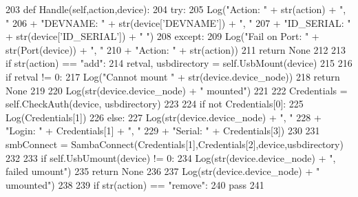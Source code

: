 \begin{DoxyCode}
203     \textcolor{keyword}{def }Handle(self,action,device):
204         \textcolor{keywordflow}{try}:
205             Log(\textcolor{stringliteral}{"Action: "} + str(action) + \textcolor{stringliteral}{", "}
206                 + \textcolor{stringliteral}{"DEVNAME: "} + str(device[\textcolor{stringliteral}{'DEVNAME'}]) + \textcolor{stringliteral}{", "}
207                 + \textcolor{stringliteral}{"ID\_SERIAL: "} + str(device[\textcolor{stringliteral}{'ID\_SERIAL'}]) + \textcolor{stringliteral}{" "})
208         \textcolor{keywordflow}{except}:
209             Log(\textcolor{stringliteral}{"Fail on Port: "} + str(Port(device)) + \textcolor{stringliteral}{", "}
210                 + \textcolor{stringliteral}{"Action: "} + str(action))
211             \textcolor{keywordflow}{return} \textcolor{keywordtype}{None}
212 
213         \textcolor{keywordflow}{if} str(action) == \textcolor{stringliteral}{"add"}:
214             retval, usbdirectory = self.UsbMount(device)
215 
216             \textcolor{keywordflow}{if} retval != 0:
217                 Log(\textcolor{stringliteral}{"Cannot mount "} + str(device.device\_node))
218                 \textcolor{keywordflow}{return} \textcolor{keywordtype}{None}
219 
220             Log(str(device.device\_node) + \textcolor{stringliteral}{" mounted"})
221 
222             Credentials = self.CheckAuth(device, usbdirectory)
223 
224             \textcolor{keywordflow}{if} \textcolor{keywordflow}{not} Credentials[0]:
225                 Log(Credentials[1])
226             \textcolor{keywordflow}{else}:
227                 Log(str(device.device\_node) + \textcolor{stringliteral}{", "}
228                     + \textcolor{stringliteral}{"Login: "} + Credentials[1] + \textcolor{stringliteral}{", "}
229                     + \textcolor{stringliteral}{"Serial: "} + Credentials[3])
230 
231                 smbConnect = SambaConnect(Credentials[1],Credentials[2],device,usbdirectory)
232 
233             \textcolor{keywordflow}{if} self.UsbUmount(device) != 0:
234                 Log(str(device.device\_node) + \textcolor{stringliteral}{", failed umount"})
235                 \textcolor{keywordflow}{return} \textcolor{keywordtype}{None}
236 
237             Log(str(device.device\_node) + \textcolor{stringliteral}{" umounted"})
238 
239         \textcolor{keywordflow}{if} str(action) == \textcolor{stringliteral}{"remove"}:
240             \textcolor{keywordflow}{pass}
241 
\end{DoxyCode}
\mbox{\label{classisofc-service_1_1DeviceHandler_a87ac1ab9b3b6658023374dd42299acec}} 
